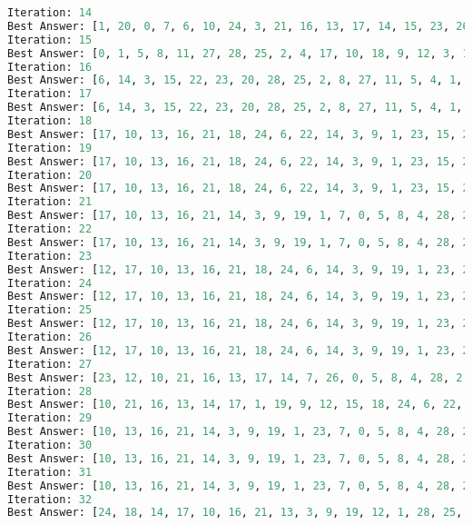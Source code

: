\documentclass[a4paper, 12pt]{article}
\theoremstyle{definition}
\begin{document}
\begin{lstlisting}[language=Python]
Iteration: 14
Best Answer: [1, 20, 0, 7, 6, 10, 24, 3, 21, 16, 13, 17, 14, 15, 23, 26, 22, 18, 9, 12, 28, 2, 25, 27, 19, 4, 5, 11, 8]: 2544
Iteration: 15
Best Answer: [0, 1, 5, 8, 11, 27, 28, 25, 2, 4, 17, 10, 18, 9, 12, 3, 14, 16, 21, 13, 19, 20, 15, 7, 26, 22, 6, 24, 23]: 2507
Iteration: 16
Best Answer: [6, 14, 3, 15, 22, 23, 20, 28, 25, 2, 8, 27, 11, 5, 4, 1, 17, 21, 19, 9, 12, 0, 7, 26, 18, 10, 13, 16, 24]: 2485
Iteration: 17
Best Answer: [6, 14, 3, 15, 22, 23, 20, 28, 25, 2, 8, 27, 11, 5, 4, 1, 17, 21, 19, 9, 12, 0, 7, 26, 18, 10, 13, 16, 24]: 2485
Iteration: 18
Best Answer: [17, 10, 13, 16, 21, 18, 24, 6, 22, 14, 3, 9, 1, 23, 15, 26, 7, 27, 20, 0, 28, 25, 2, 4, 5, 11, 8, 19, 12]: 2317
Iteration: 19
Best Answer: [17, 10, 13, 16, 21, 18, 24, 6, 22, 14, 3, 9, 1, 23, 15, 26, 7, 27, 20, 0, 28, 25, 2, 4, 5, 11, 8, 19, 12]: 2317
Iteration: 20
Best Answer: [17, 10, 13, 16, 21, 18, 24, 6, 22, 14, 3, 9, 1, 23, 15, 26, 7, 27, 20, 0, 28, 25, 2, 4, 5, 11, 8, 19, 12]: 2317
Iteration: 21
Best Answer: [17, 10, 13, 16, 21, 14, 3, 9, 19, 1, 7, 0, 5, 8, 4, 28, 2, 25, 20, 11, 27, 26, 22, 6, 23, 24, 18, 15, 12]: 2225
Iteration: 22
Best Answer: [17, 10, 13, 16, 21, 14, 3, 9, 19, 1, 7, 0, 5, 8, 4, 28, 2, 25, 20, 11, 27, 26, 22, 6, 23, 24, 18, 15, 12]: 2225
Iteration: 23
Best Answer: [12, 17, 10, 13, 16, 21, 18, 24, 6, 14, 3, 9, 19, 1, 23, 26, 22, 7, 0, 15, 20, 28, 2, 25, 8, 11, 27, 5, 4]: 2215
Iteration: 24
Best Answer: [12, 17, 10, 13, 16, 21, 18, 24, 6, 14, 3, 9, 19, 1, 23, 26, 22, 7, 0, 15, 20, 28, 2, 25, 8, 11, 27, 5, 4]: 2215
Iteration: 25
Best Answer: [12, 17, 10, 13, 16, 21, 18, 24, 6, 14, 3, 9, 19, 1, 23, 26, 22, 7, 0, 15, 20, 28, 2, 25, 8, 11, 27, 5, 4]: 2215
Iteration: 26
Best Answer: [12, 17, 10, 13, 16, 21, 18, 24, 6, 14, 3, 9, 19, 1, 23, 26, 22, 7, 0, 15, 20, 28, 2, 25, 8, 11, 27, 5, 4]: 2215
Iteration: 27
Best Answer: [23, 12, 10, 21, 16, 13, 17, 14, 7, 26, 0, 5, 8, 4, 28, 2, 25, 20, 11, 27, 22, 6, 24, 18, 15, 3, 9, 19, 1]: 2172
Iteration: 28
Best Answer: [10, 21, 16, 13, 14, 17, 1, 19, 9, 12, 15, 18, 24, 6, 22, 23, 26, 7, 27, 20, 0, 28, 25, 2, 4, 5, 11, 8, 3]: 2161
Iteration: 29
Best Answer: [10, 13, 16, 21, 14, 3, 9, 19, 1, 23, 7, 0, 5, 8, 4, 28, 2, 25, 20, 11, 27, 26, 22, 6, 24, 18, 15, 12, 17]: 2008
Iteration: 30
Best Answer: [10, 13, 16, 21, 14, 3, 9, 19, 1, 23, 7, 0, 5, 8, 4, 28, 2, 25, 20, 11, 27, 26, 22, 6, 24, 18, 15, 12, 17]: 2008
Iteration: 31
Best Answer: [10, 13, 16, 21, 14, 3, 9, 19, 1, 23, 7, 0, 5, 8, 4, 28, 2, 25, 20, 11, 27, 26, 22, 6, 24, 18, 15, 12, 17]: 2008
Iteration: 32
Best Answer: [24, 18, 14, 17, 10, 16, 21, 13, 3, 9, 19, 12, 1, 28, 25, 2, 4, 8, 5, 11, 27, 20, 0, 22, 26, 7, 23, 15, 6]: 1971

\end{lstlisting}
\end{document}
